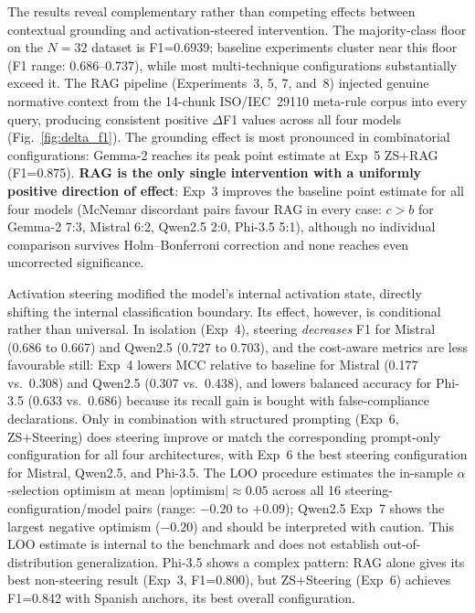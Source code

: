 \documentclass{ieeeaccess}
\begin{document}
The results reveal complementary rather than competing effects between contextual grounding and activation-steered intervention. The majority-class floor on the $N=32$ dataset is F1=0.6939; baseline experiments cluster near this floor (F1 range: 0.686--0.737), while most multi-technique configurations substantially exceed it. The RAG pipeline (Experiments~3, 5, 7, and~8) injected genuine normative context from the 14-chunk ISO/IEC~29110 meta-rule corpus into every query, producing consistent positive $\Delta$F1 values across all four models (Fig.~\ref{fig:delta_f1}). The grounding effect is most pronounced in combinatorial configurations: Gemma-2 reaches its peak point estimate at Exp~5 ZS+RAG (F1=0.875). \textbf{RAG is the only single intervention with a uniformly positive direction of effect}: Exp~3 improves the baseline point estimate for all four models (McNemar discordant pairs favour RAG in every case: $c>b$ for Gemma-2 7:3, Mistral 6:2, Qwen2.5 2:0, Phi-3.5 5:1), although no individual comparison survives Holm--Bonferroni correction and none reaches even uncorrected significance.

Activation steering modified the model's internal activation state, directly shifting the internal classification boundary. Its effect, however, is conditional rather than universal. In isolation (Exp~4), steering \emph{decreases} F1 for Mistral (0.686 to 0.667) and Qwen2.5 (0.727 to 0.703), and the cost-aware metrics are less favourable still: Exp~4 lowers MCC relative to baseline for Mistral (0.177 vs.\ 0.308) and Qwen2.5 (0.307 vs.\ 0.438), and lowers balanced accuracy for Phi-3.5 (0.633 vs.\ 0.686) because its recall gain is bought with false-compliance declarations. Only in combination with structured prompting (Exp~6, ZS+Steering) does steering improve or match the corresponding prompt-only configuration for all four architectures, with Exp~6 the best steering configuration for Mistral, Qwen2.5, and Phi-3.5. The LOO procedure estimates the in-sample $\alpha$-selection optimism at mean $|$optimism$| \approx 0.05$ across all 16 steering-configuration/model pairs (range: $-0.20$ to $+0.09$); Qwen2.5 Exp~7 shows the largest negative optimism ($-0.20$) and should be interpreted with caution. This LOO estimate is internal to the benchmark and does not establish out-of-distribution generalization. Phi-3.5 shows a complex pattern: RAG alone gives its best non-steering result (Exp~3, F1=0.800), but ZS+Steering (Exp~6) achieves F1=0.842 with Spanish anchors, its best overall configuration.
\end{document}

